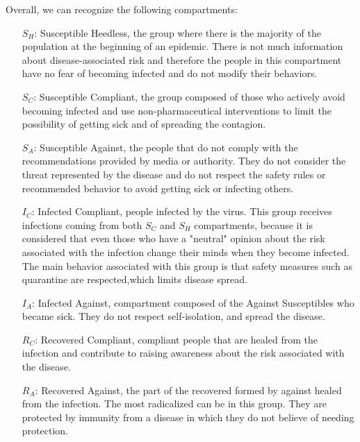 Overall, we can recognize the following compartments:
\begin{itemize}
	\item[$S_H$:] Susceptible Heedless, the group where there is the majority of the population at the beginning of an epidemic. There is not much information about disease-associated risk and therefore the people in this compartment have no fear of becoming infected and do not modify their behaviors.
	\item[$S_C$:] Susceptible Compliant, the group composed of those who actively avoid becoming infected and use non-pharmaceutical interventions to limit the possibility of getting sick and of spreading the contagion.
	\item[$S_A$:] Susceptible Against, the people that do not comply with the recommendations provided by media or authority. They do not consider the threat represented by the disease and do not respect the safety rules or recommended behavior to avoid getting sick or infecting others. 
	\item[$I_C$:] Infected Compliant, people infected by the virus. This group receives infections coming from both $S_C$ and $S_H$ compartments, because it is considered that even those who have a "neutral" opinion about the risk associated with the infection change their minds when they become infected. The main behavior associated with this group is that safety measures such as quarantine are respected,which limits disease spread.
	\item[$I_A$:] Infected Against, compartment composed of the Against Susceptibles who became sick. They do not respect self-isolation, and spread the disease. 
	\item[$R_C$:] Recovered Compliant, compliant people that are healed from the infection and contribute to raising awareness about the risk associated with the disease. 
	\item[$R_A$:] Recovered Against, the part of the recovered formed by against healed from the infection. The most radicalized can be in this group. They are protected by immunity from a disease in which they do not believe of needing protection. 
\end{itemize}

